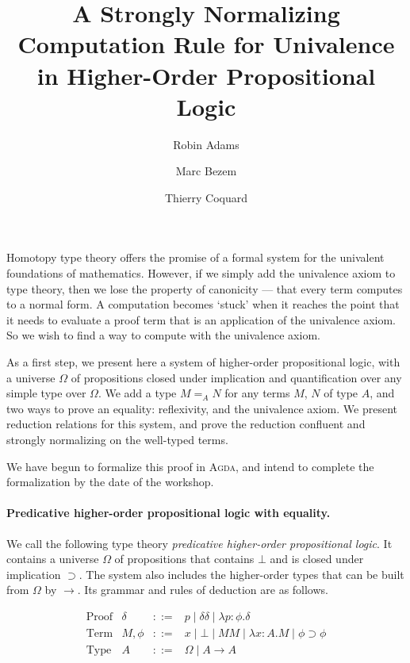\documentclass{easychair}
\title{A Strongly Normalizing Computation Rule for Univalence in Higher-Order Propositional Logic}
\author{Robin Adams\inst{1} \and Marc Bezem\inst{1} \and Thierry Coquard\inst{2}}
\institute{Universitetet i Bergen,
Bergen, Norway \\
\email{\{robin.adams,marc\}@uib.no}
\and
University of Gothenburg,
Gothenburg, Sweden \\
\email{coquand@chalmers.se}}
\begin{document}
\maketitle

Homotopy type theory offers the promise of a formal system for the univalent foundations of mathematics.  However, if
we simply add the univalence axiom to type theory, then we lose the property of canonicity --- that every term computes to
a normal form.  A computation becomes `stuck' when it reaches the point that it needs to evaluate a proof term
that is an application of the univalence axiom.  So we wish to find a way to compute with the univalence axiom.

As a first step, we present here a system of higher-order propositional logic,  with a universe $\Omega$ of propositions
closed under implication and quantification over any simple type over $\Omega$.  We add a type $M =_A N$ for any terms $M$, $N$ of type $A$,
and two ways to prove an equality: reflexivity, and the univalence axiom.  We present reduction relations for this system, and prove the reduction confluent and strongly normalizing
on the well-typed terms.

We have begun to formalize this proof in \textsc{Agda}, and intend to complete the formalization by the date of the workshop.

\paragraph{Predicative higher-order propositional logic with equality.}

We call the following type theory \emph{predicative higher-order propositional logic}.  It contains a universe $\Omega$ of propositions that contains $\bot$ and
is closed under implication $\supset$.  The system also includes the higher-order types that can be built from $\Omega$ by $\rightarrow$.  Its grammar and rules of deduction are as follows.

\[ \begin{array}{lrcl}
\text{Proof} & \delta & ::= & p \mid \delta \delta \mid \lambda p : \phi . \delta \\
\text{Term} & M, \phi & ::= & x \mid \bot \mid M M \mid \lambda x : A . M \mid \phi \supset \phi \\
\text{Type} & A & ::= & \Omega \mid A \rightarrow A \\
\end{array} \]
\end{document}
